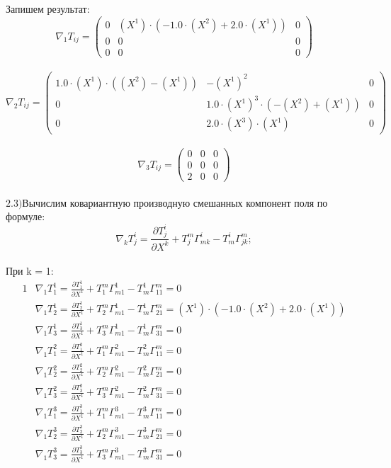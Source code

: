 \documentclass{article}
\begin{document}
Запишем результат:\\
\[
\nabla_1T_{ij} = \begin{pmatrix}
	0 & (X^1)\cdot (-1.0\cdot (X^2) + 2.0\cdot (X^1)) & 0\\
	0 & 0 & 0\\
	0 & 0 & 0
\end{pmatrix}
\]\\
\[
\nabla_2T_{ij} = \begin{pmatrix}
	1.0\cdot (X^1)\cdot ((X^2) - (X^1)) & -(X^1)^2 & 0\\
	0 & 1.0\cdot (X^1)^3\cdot (-(X^2) + (X^1)) & 0\\
	0 & 2.0\cdot (X^3)\cdot (X^1) & 0
\end{pmatrix}
\]\\
\[
\nabla_3T_{ij} = \begin{pmatrix}
	0 & 0 & 0\\
	0 & 0 & 0\\
	2 & 0 & 0
\end{pmatrix}
\]\\
$\mathrm{2.3) }$Вычислим ковариантную производную смешанных компонент поля по формуле:\\
\[
\nabla_kT^i_j = \frac{\partial T^i_j}{\partial X^k} + T^m_j\Gamma^i_{mk} - T^i_m\Gamma^m_{jk};
\]\\
При k = 1:\\
\begin{alignat*}{1}
  & \nabla_1T^1_1 = \frac{\partial T^1_1}{\partial X^1} + T^m_1\Gamma^1_{m1} - T^1_m\Gamma^m_{11} = 0 \\
  & \nabla_1T^1_2 = \frac{\partial T^1_2}{\partial X^1} + T^m_2\Gamma^1_{m1} - T^1_m\Gamma^m_{21} = (X^1)\cdot (-1.0\cdot (X^2) + 2.0\cdot (X^1)) \\
  & \nabla_1T^1_3 = \frac{\partial T^1_3}{\partial X^1} + T^m_3\Gamma^1_{m1} - T^1_m\Gamma^m_{31} = 0 \\
  & \nabla_1T^2_1 = \frac{\partial T^2_1}{\partial X^1} + T^m_1\Gamma^2_{m1} - T^2_m\Gamma^m_{11} = 0 \\
  & \nabla_1T^2_2 = \frac{\partial T^2_2}{\partial X^1} + T^m_2\Gamma^2_{m1} - T^2_m\Gamma^m_{21} = 0 \\
  & \nabla_1T^2_3 = \frac{\partial T^2_3}{\partial X^1} + T^m_3\Gamma^2_{m1} - T^2_m\Gamma^m_{31} = 0 \\
  & \nabla_1T^3_1 = \frac{\partial T^3_1}{\partial X^1} + T^m_1\Gamma^3_{m1} - T^3_m\Gamma^m_{11} = 0 \\
  & \nabla_1T^3_2 = \frac{\partial T^3_2}{\partial X^1} + T^m_2\Gamma^3_{m1} - T^3_m\Gamma^m_{21} = 0 \\
  & \nabla_1T^3_3 = \frac{\partial T^3_3}{\partial X^1} + T^m_3\Gamma^3_{m1} - T^3_m\Gamma^m_{31} = 0 
\end{alignat*}\\
\end{document}
